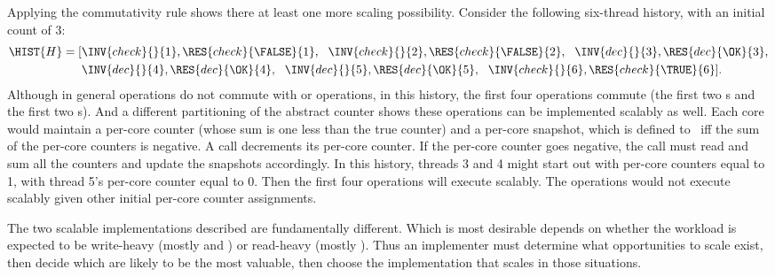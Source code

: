 Applying the commutativity rule shows there at least one more scaling
possibility.
Consider the following six-thread history, with an initial
count of 3:
%
\begin{align*}
\HIST{H} = [& \INV{check}{}{1}, \RES{check}{\FALSE}{1}, ~~
	      \INV{check}{}{2}, \RES{check}{\FALSE}{2}, ~~
	      \INV{dec}{}{3}, \RES{dec}{\OK}{3}, \\
            & \INV{dec}{}{4}, \RES{dec}{\OK}{4}, ~~
	      \INV{dec}{}{5}, \RES{dec}{\OK}{5}, ~~
              \INV{check}{}{6}, \RES{check}{\TRUE}{6}].
\end{align*}
%
Although in general  operations do not commute with 
or  operations, in this history, the first four operations
commute (the first two s and the first two s).
%
And a different partitioning of the abstract counter shows these
operations can be implemented scalably as well.
%
Each core would maintain a per-core counter 
  (whose sum is one
  less than the true counter) and a
  per-core  snapshot, which is defined to
  \TRUE\ iff the sum of the per-core counters is negative. A 
  call decrements its per-core counter. If the per-core counter goes
  negative, the  call must read and sum all the counters and update
  the  snapshots accordingly.
  In this history, threads 3 and 4 might start out with per-core
  counters equal to 1, with thread 5's per-core counter equal to 0.
  Then the first four operations will execute scalably.
  The operations would not execute scalably given other
  initial per-core counter assignments.

The two scalable implementations described are fundamentally different.
Which is most desirable depends on whether the workload is
expected to be write-heavy (mostly  and ) or
read-heavy (mostly ).
Thus an implementer must determine what opportunities to scale exist,
then decide which are likely to be the most valuable,
then choose the implementation that scales in those situations.

